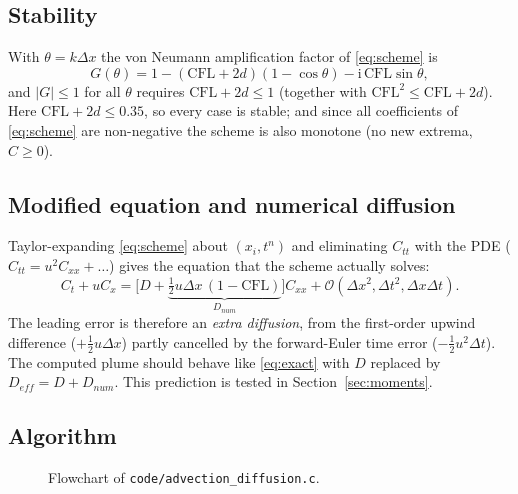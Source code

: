 \subsection{Stability}
With $\theta=k\Delta x$ the von Neumann amplification factor of \eqref{eq:scheme} is
\begin{equation}
G(\theta)=1-(\mathrm{CFL}+2d)(1-\cos\theta)-\mathrm{i}\,\mathrm{CFL}\sin\theta ,
\end{equation}
and $|G|\le1$ for all $\theta$ requires $\mathrm{CFL}+2d\le1$ (together with $\mathrm{CFL}^2\le\mathrm{CFL}+2d$). Here $\mathrm{CFL}+2d\le0.35$, so every case is stable; and since all coefficients of \eqref{eq:scheme} are non-negative the scheme is also monotone (no new extrema, $C\ge0$).

\subsection{Modified equation and numerical diffusion}
Taylor-expanding \eqref{eq:scheme} about $(x_i,t^n)$ and eliminating $C_{tt}$ with the PDE ($C_{tt}=u^2C_{xx}+\dots$) gives the equation that the scheme actually solves:
\begin{equation}
C_t+uC_x=\Big[D+\underbrace{\tfrac12u\Delta x\,(1-\mathrm{CFL})}_{D_{num}}\Big]C_{xx}+\mathcal{O}(\Delta x^2,\Delta t^2,\Delta x\Delta t).
\end{equation}
The leading error is therefore an \emph{extra diffusion}, from the first-order upwind difference ($+\tfrac12u\Delta x$) partly cancelled by the forward-Euler time error ($-\tfrac12u^2\Delta t$). The computed plume should behave like \eqref{eq:exact} with $D$ replaced by $D_{eff}=D+D_{num}$. This prediction is tested in Section~\ref{sec:moments}.

\subsection{Algorithm}
\begin{figure}[H]\centering
{}
\caption{Flowchart of \texttt{code/advection\_diffusion.c}.}\end{figure}

